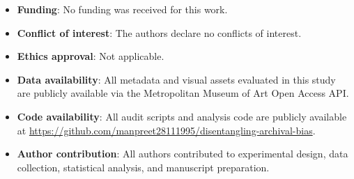 \documentclass[pdflatex,sn-mathphys-num]{sn-jnl}%
\theoremstyle{thmstyleone}%
\theoremstyle{thmstyletwo}%
\theoremstyle{thmstylethree}%
\begin{document}
\begin{itemize}
\item \textbf{Funding}: No funding was received for this work.
\item \textbf{Conflict of interest}: The authors declare no conflicts of interest.
\item \textbf{Ethics approval}: Not applicable.
\item \textbf{Data availability}: All metadata and visual assets evaluated in this study are publicly available via the Metropolitan Museum of Art Open Access API.
\item \textbf{Code availability}: All audit scripts and analysis code are publicly available at \url{https://github.com/manpreet28111995/disentangling-archival-bias}.
\item \textbf{Author contribution}: All authors contributed to experimental design, data collection, statistical analysis, and manuscript preparation.
\end{itemize}



\end{document}
